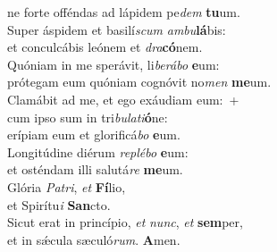 \evenverse ne forte offéndas ad lápidem pe\textit{dem} \textbf{tu}um.\\
\oddverse Super áspidem et basilí\textit{scum} \textit{am}\textit{bu}\textbf{lá}bis:~\*\\
\oddverse et conculcábis leónem et \textit{dra}\textbf{có}nem.\\
\evenverse Quóniam in me sperávit, li\textit{be}\textit{rá}\textit{bo} \textbf{e}um:~\*\\
\evenverse prótegam eum quóniam cognóvit no\textit{men} \textbf{me}um.\\
\oddverse Clamábit ad me, et ego exáudiam eum:~+\\
\oddverse  cum ipso sum in tri\textit{bu}\textit{la}\textit{ti}\textbf{ó}ne:~\*\\
\oddverse erípiam eum et glorificá\textit{bo} \textbf{e}um.\\
\evenverse Longitúdine diérum \textit{re}\textit{plé}\textit{bo} \textbf{e}um:~\*\\
\evenverse et osténdam illi salutá\textit{re} \textbf{me}um.\\
\oddverse Glória \textit{Pa}\textit{tri}, \textit{et} \textbf{Fí}lio,~\*\\
\oddverse et Spirítu\textit{i} \textbf{San}cto.\\
\evenverse Sicut erat in princípio, \textit{et} \textit{nunc}, \textit{et} \textbf{sem}per,~\*\\
\evenverse et in sǽcula sæculó\textit{rum}. \textbf{A}men.\\
